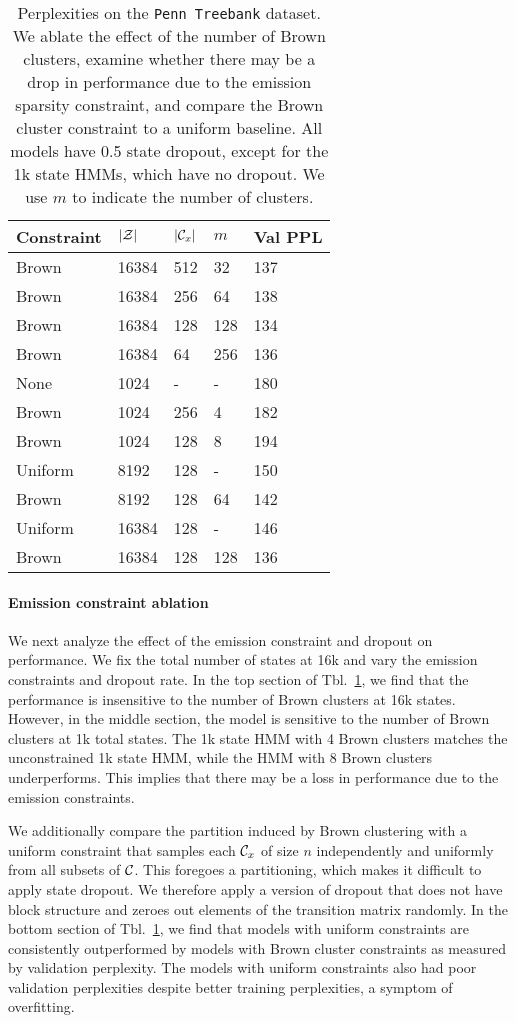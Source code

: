 \documentclass[11pt,a4paper]{article}
\begin{document}
\begin{table}[h]
\centering
\begin{tabular}{lllll}
\toprule
Constraint & $|\mathcal{Z}|$ & $|\mathcal{C}_x|$ & $m$ & Val PPL\\
\midrule
Brown & 16384 & 512 & 32  & 137\\
Brown & 16384 & 256 & 64  & 138\\
Brown & 16384 & 128 & 128 & 134\\
Brown & 16384 & 64  & 256 & 136\\
\midrule
None  & 1024 & - & - & 180\\
Brown & 1024 & 256 & 4 & 182\\
Brown & 1024 & 128 & 8 & 194\\
\midrule
Uniform    & 8192    & 128    & -   & 150\\
Brown      & 8192    & 128    & 64  & 142\\
Uniform    & 16384   & 128    & -   & 146\\
Brown      & 16384   & 128    & 128 & 136\\
\bottomrule
\end{tabular}
\caption{\label{tbl:constraint-ablation}
Perplexities on the \texttt{Penn Treebank} dataset.
We ablate the effect of the number of Brown clusters,
examine whether there may be a drop in performance due to the emission sparsity constraint,
and compare the Brown cluster constraint to a uniform baseline.
All models have 0.5 state dropout, except for the 1k state HMMs,
which have no dropout.
We use $m$ to indicate the number of clusters.
}
\end{table}

\paragraph{Emission constraint ablation}
We next analyze the effect of the emission constraint and dropout on performance.
We fix the total number of states at 16k 
and vary the emission constraints and dropout rate.
In the top section of Tbl.~\ref{tbl:constraint-ablation},
we find that the performance is
insensitive to the number of Brown clusters at 16k states.
However, in the middle section,
the model is sensitive to the number of Brown clusters
at 1k total states.
The 1k state HMM with 4 Brown clusters matches the unconstrained 1k state HMM,
while the HMM with 8 Brown clusters underperforms.
This implies that there may be a loss in performance due to the emission constraints.

We additionally compare the partition induced by Brown clustering with a uniform
constraint that samples each $\mathcal{C}_x$ of size $n$
independently and uniformly from all subsets of $\mathcal{C}$.
This foregoes a partitioning, which makes it difficult to apply state dropout.
We therefore apply a version of dropout that does not have block structure
and zeroes out elements of the transition matrix randomly.
In the bottom section of Tbl.~\ref{tbl:constraint-ablation},
we find that models with uniform constraints
are consistently outperformed by models with Brown cluster constraints
as measured by validation perplexity.
The models with uniform constraints also had poor validation perplexities
despite better training perplexities, a symptom of overfitting.
\end{document}
